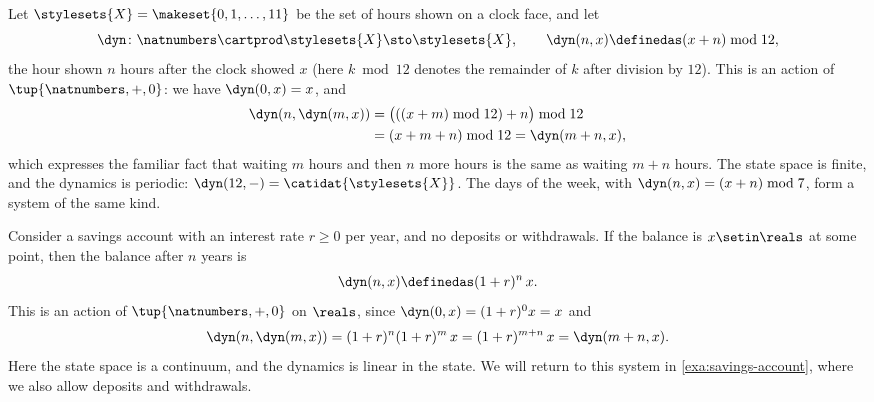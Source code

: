\begin{example}[A clock]
    \label{exa:clock-dynamical-system}
    Let $\stylesets{X} = \makeset{0, 1, \dots, 11}$ be the set of hours shown on a clock face, and let
    \begin{equation}
        \dyn \colon \natnumbers \cartprod \stylesets{X} \sto \stylesets{X}, \qquad \dyn(n, x) \definedas (x + n) \bmod 12,
    \end{equation}
    the hour shown $n$ hours after the clock showed $x$ (here $k \bmod 12$ denotes the remainder of $k$ after division by $12$).
    This is an action of $\tup{\natnumbers, +, 0}$: we have $\dyn(0, x) = x$, and
    \begin{equation}
        \begin{aligned}
            \dyn(n, \dyn(m, x)) & = \bigl(((x + m) \bmod 12) + n\bigr) \bmod 12 \\
                                & = (x + m + n) \bmod 12 = \dyn(m + n, x),
        \end{aligned}
    \end{equation}
    which expresses the familiar fact that waiting $m$ hours and then $n$ more hours is the same as waiting $m + n$ hours.
    The state space is finite, and the dynamics is periodic: $\dyn(12, -) = \catidat{\stylesets{X}}$.
    The days of the week, with $\dyn(n, x) = (x + n) \bmod 7$, form a system of the same kind.
\end{example}

\begin{example}
    \label{exa:compound-interest}
    Consider a savings account with an interest rate $r \geq 0$ per year, and no deposits or withdrawals.
    If the balance is $x \setin \reals$ at some point, then the balance after $n$ years is
    \begin{equation}
        \dyn(n, x) \definedas (1 + r)^n \, x.
    \end{equation}
    This is an action of $\tup{\natnumbers, +, 0}$ on $\reals$, since $\dyn(0, x) = (1 + r)^0 x = x$ and
    \begin{equation}
        \dyn(n, \dyn(m, x)) = (1 + r)^n (1 + r)^m \, x = (1 + r)^{m + n} \, x = \dyn(m + n, x).
    \end{equation}
    Here the state space is a continuum, and the dynamics is linear in the state.
    We will return to this system in \cref{exa:savings-account}, where we also allow deposits and withdrawals.
\end{example}


